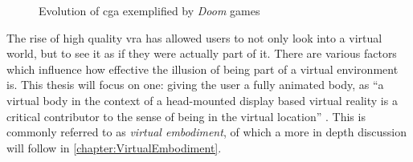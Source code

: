 \begin{figure}[h]%
  \centering
  \hfill
  \caption{Evolution of \gls{cga} exemplified by \textit{Doom} games}
  \label{fig:doom1993vs2016}
\end{figure}

The rise of high quality \gls{vra} has allowed users to not only look into a virtual world, but to see it as if they were actually part of it. There are various factors which influence how effective the illusion of being part of a virtual environment is. This thesis will focus on one: giving the user a fully animated body, as \enquote{a virtual body in the context of a head-mounted display based virtual reality is a critical contributor to the sense of being in the virtual location} \autocite[p.~374]{senseEmbodimentVR}. This is commonly referred to as \textit{virtual embodiment}, of which a more in depth discussion will follow in \autoref{chapter:VirtualEmbodiment}.
\newline

